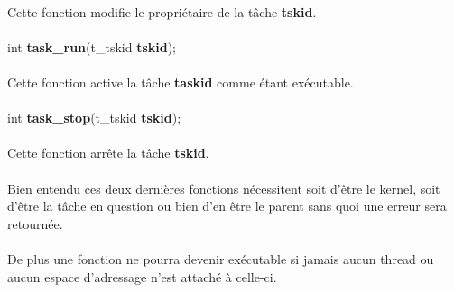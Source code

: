 \documentclass[10pt,a4wide]{article}
\begin{document}
\paragraph{}

Cette fonction modifie le propri\'etaire de la t\^ache \textbf{tskid}.

\paragraph{}

\hspace{1.5cm}int \textbf{task\_run}(t\_tskid \textbf{tskid});

\paragraph{}

Cette fonction active la t\^ache \textbf{taskid} comme \'etant ex\'ecutable.

\paragraph{}

\hspace{1.5cm}int \textbf{task\_stop}(t\_tskid \textbf{tskid});

\paragraph{}

Cette fonction arr\^ete la t\^ache \textbf{tskid}.

\paragraph{}

Bien entendu ces deux derni\`eres fonctions n\'ecessitent soit
d'\^etre le kernel, soit d'\^etre la t\^ache en question ou bien d'en
\^etre le parent sans quoi une erreur sera retourn\'ee.

\paragraph{}

De plus une fonction ne pourra devenir ex\'ecutable si jamais aucun
thread ou aucun espace d'adressage n'est attach\'e \`a celle-ci.

\paragraph{}
\end{document}
